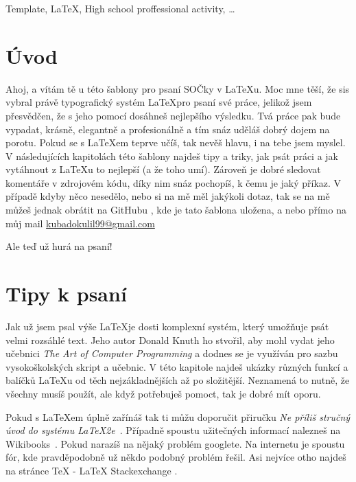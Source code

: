 \documentclass[12pt, a4paper,
 twoside,        %
 openright
]{report}
\begin{document}
\noindent Template, \LaTeX, High school proffessional activity, \dots 


\cleardoublepage

\tableofcontents

\pagestyle{fancy}
\setcounter{page}{1}

\chapter*{Úvod}
Ahoj,
a vítám tě u této šablony pro psaní SOČky v \LaTeX u. Moc mne těší, že sis vybral právě typografický systém \LaTeX pro psaní své práce, jelikož jsem přesvědčen, že s jeho pomocí dosáhneš nejlepšího výsledku. Tvá práce pak bude vypadat, krásně, elegantně a profesionálně a tím snáz uděláš dobrý dojem na porotu. Pokud se s \LaTeX em teprve učíš, tak nevěš hlavu, i na tebe jsem myslel. V následujících kapitolách této šablony najdeš tipy a triky, jak psát práci a jak vytáhnout z \LaTeX u to nejlepší (a že toho umí). Zároveň je dobré sledovat komentáře v zdrojovém kódu, díky nim snáz pochopíš, k čemu je jaký příkaz. V případě kdyby něco nesedělo, nebo si na mě měl jakýkoli dotaz, tak se na mě můžeš jednak obrátit na GitHubu \cite{sablonaSOC}, kde je tato šablona uložena, a nebo přímo na můj mail \url{kubadokulil99@gmail.com}

Ale teď už hurá na psaní!

\chapter{Tipy k psaní}

Jak už jsem psal výše \LaTeX je dosti komplexní systém, který umožňuje psát velmi rozsáhlé text. Jeho autor Donald Knuth ho stvořil, aby mohl vydat jeho učebnici \emph{The Art of Computer Programming} a dodnes se je využíván pro sazbu vysokoškolských skript a učebnic. V této kapitole najdeš ukázky různých funkcí a balíčků \LaTeX u od těch nejzákladnějších až po složitější. Neznamená to nutně, že všechny musíš použít, ale když potřebuješ pomoct, tak je dobré mít oporu. 

Pokud s \LaTeX em úplně zařínáš tak ti můžu doporučit přiručku \emph{Ne příliš stručný úvod do systému \LaTeX2e}~\cite{LaTeXprirucka}. Případně spoustu užitečných informací nalezneš na Wikibooks~\cite{wikibooksLaTeX}. Pokud narazíš na nějaký problém googlete. Na internetu je spoustu fór, kde pravděpodobně už někdo podobný problém řešil. Asi nejvíce otho najdeš na stránce TeX - LaTeX Stackexchange \cite{stackExchange}.
\end{document}
